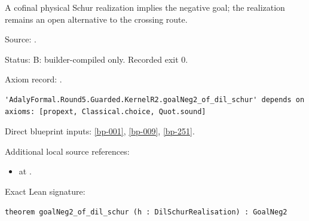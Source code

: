 \begin{theorem}[bp-059]
\label{bp-059}
\leanok
A cofinal physical Schur realization implies the negative goal; the realization remains an open alternative to the crossing route.

\par Source: \texttt{}.
\par Status: B: builder-compiled only. Recorded exit 0.
\par Axiom record: \texttt{}.
\begin{verbatim}
'AdalyFormal.Round5.Guarded.KernelR2.goalNeg2_of_dil_schur' depends on axioms: [propext, Classical.choice, Quot.sound]
\end{verbatim}
\par Direct blueprint inputs: \ref{bp-001}, \ref{bp-009}, \ref{bp-251}.
\par Additional local source references:
\begin{itemize}
\item \texttt{} at \texttt{}.
\end{itemize}
\par Exact Lean signature:
\begin{verbatim}
theorem goalNeg2_of_dil_schur (h : DilSchurRealisation) : GoalNeg2
\end{verbatim}
\end{theorem}

